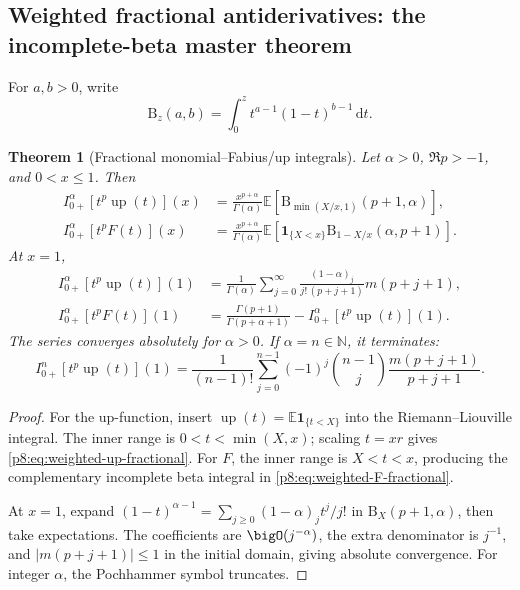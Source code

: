 \documentclass[11pt,oneside]{article}
\newtheorem{theorem}{Theorem}[section]
\theoremstyle{definition}
\theoremstyle{remark}
\newcommand{\Up}{\operatorname{up}}
\newcommand{\E}{\mathbb E}
\newcommand{\N}{\mathbb N}
\newcommand{\dd}{\,\mathrm d}
\newcommand{\1}{\mathbf 1}
\begin{document}
\subsection{Weighted fractional antiderivatives: the incomplete-beta master theorem}

For \(a,b>0\), write
\begin{equation}
 \mathrm B_z(a,b)=\int_0^z t^{a-1}(1-t)^{b-1}\dd t.
 \label{p8:eq:incomplete-beta}
\end{equation}

\begin{theorem}[Fractional monomial--Fabius/up integrals]
\label{p8:thm:weighted-fractional-master}
Let \(\alpha>0\), \(\Re p>-1\), and \(0<x\le1\).  Then
\begin{align}
 I_{0+}^{\alpha}[t^p\Up(t)](x)
 &=\frac{x^{p+\alpha}}{\Gamma(\alpha)}
 \E\!\left[
 \mathrm B_{\min(X/x,1)}(p+1,\alpha)
 \right],
 \label{p8:eq:weighted-up-fractional}\\
 I_{0+}^{\alpha}[t^pF(t)](x)
 &=\frac{x^{p+\alpha}}{\Gamma(\alpha)}
 \E\!\left[
 \mathbf1_{\{X<x\}}
 \mathrm B_{1-X/x}(\alpha,p+1)
 \right].
 \label{p8:eq:weighted-F-fractional}
\end{align}
At \(x=1\),
\begin{align}
 I_{0+}^{\alpha}[t^p\Up(t)](1)
 &=\frac1{\Gamma(\alpha)}
 \sum_{j=0}^{\infty}
 \frac{(1-\alpha)_j}{j!\,(p+j+1)}m(p+j+1),
 \label{p8:eq:weighted-up-series}\\
 I_{0+}^{\alpha}[t^pF(t)](1)
 &=\frac{\Gamma(p+1)}{\Gamma(p+\alpha+1)}
 -I_{0+}^{\alpha}[t^p\Up(t)](1).
 \label{p8:eq:weighted-F-series}
\end{align}
The series converges absolutely for \(\alpha>0\).  If \(\alpha=n\in\N\), it
terminates:
\begin{equation}
 I_{0+}^{n}[t^p\Up(t)](1)
 =\frac1{(n-1)!}
 \sum_{j=0}^{n-1}(-1)^j\binom{n-1}{j}
 \frac{m(p+j+1)}{p+j+1}.
 \label{p8:eq:weighted-integer-terminating}
\end{equation}
\statusprovedPartll
\end{theorem}

\begin{proof}
For the up-function, insert
\(\Up(t)=\E\mathbf1_{\{t<X\}}\) into the Riemann--Liouville integral.  The
inner range is \(0<t<\min(X,x)\); scaling \(t=xr\) gives
\eqref{p8:eq:weighted-up-fractional}.  For \(F\), the inner range is
\(X<t<x\), producing the complementary incomplete beta integral in
\eqref{p8:eq:weighted-F-fractional}.

At \(x=1\), expand
\((1-t)^{\alpha-1}=\sum_{j\ge0}(1-\alpha)_jt^j/j!\) in
\(\mathrm B_X(p+1,\alpha)\), then take expectations.  The coefficients are
\(\bigO(j^{-\alpha})\), the extra denominator is \(j^{-1}\), and
\(|m(p+j+1)|\le1\) in the initial domain, giving absolute convergence.
For integer \(\alpha\), the Pochhammer symbol truncates.
\end{proof}
\end{document}
